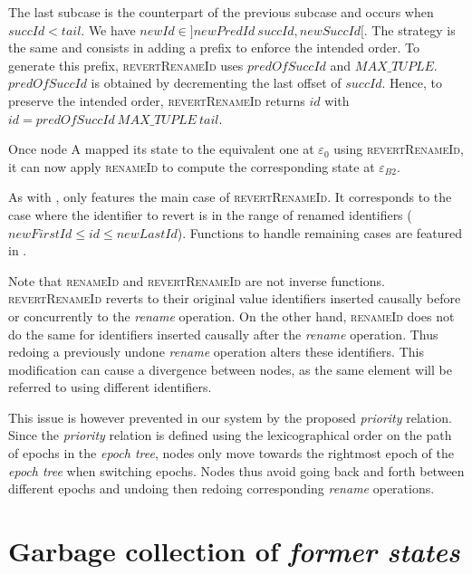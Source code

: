 \documentclass[10pt,journal,compsoc]{IEEEtran}
\newcommand{\trm}[1]{\mathit{#1}}
\newcommand{\epoch}[1]{$\varepsilon_{#1}$}
\begin{document}
The last subcase is the counterpart of the previous subcase and occurs when $\trm{succId} < \trm{tail}$.
We have $\trm{newId} \in ]\trm{newPredId~succId}, \trm{newSuccId}[$.
The strategy is the same and consists in adding a prefix to enforce the intended order.
To generate this prefix, \textsc{revertRenameId} uses $\trm{predOfSuccId}$ and $MAX\_TUPLE$.
$\trm{predOfSuccId}$ is obtained by decrementing the last offset of $\trm{succId}$.
Hence, to preserve the intended order, \textsc{revertRenameId} returns $\trm{id}$ with $\trm{id} = \trm{predOfSuccId~MAX\_TUPLE~tail}$.

Once node A mapped its state to the equivalent one at \epoch{0} using \textsc{revertRenameId}, it can now apply \textsc{renameId} to compute the corresponding state at \epoch{B2}.

As with ,  only features the main case of \textsc{revertRenameId}.
It corresponds to the case where the identifier to revert is in the range of renamed identifiers ($\trm{newFirstId} \leq \trm{id} \leq \trm{newLastId}$).
Functions to handle remaining cases are featured in .

Note that \textsc{renameId} and \textsc{revertRenameId} are not inverse functions.
\textsc{revertRenameId} reverts to their original value identifiers inserted causally before or concurrently to the \emph{rename} operation.
On the other hand, \textsc{renameId} does not do the same for identifiers inserted causally after the \emph{rename} operation.
Thus redoing a previously undone \emph{rename} operation alters these identifiers.
This modification can cause a divergence between nodes, as the same element will be referred to using different identifiers.

This issue is however prevented in our system by the proposed \emph{priority} relation.
Since the \emph{priority} relation is defined using the lexicographical order on the path of epochs in the \emph{epoch tree}, nodes only move towards the rightmost epoch of the \emph{epoch tree} when switching epochs.
Nodes thus avoid going back and forth between different epochs and undoing then redoing corresponding \emph{rename} operations.

\section{Garbage collection of \emph{former states}}

\label{sec:gc-former-states}
\end{document}
